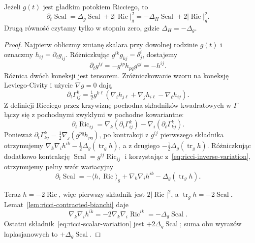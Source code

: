 \begin{twierdzenie}
\label{thm:ricci-scalar-evolution}
Jeżeli $g(t)$ jest gładkim potokiem Ricciego, to
\begin{equation}\label{eq:ricci-scalar-evolution}
 \partial_t\operatorname{Scal}
 =\Delta_g\operatorname{Scal}
  +2|\operatorname{Ric}|_g^2
 =-\Delta_H\operatorname{Scal}
  +2|\operatorname{Ric}|_g^2.
\end{equation}
Drugą równość czytamy tylko w stopniu zero, gdzie
$\Delta_H=-\Delta_g$.
\end{twierdzenie}
\begin{proof}
Najpierw obliczmy zmianę skalara przy dowolnej
rodzinie $g(t)$ i oznaczmy $h_{ij}=\partial_tg_{ij}$.
Różniczkując $g^{ik}g_{kj}=\delta^i_j$, dostajemy
\begin{equation}\label{eq:ricci-inverse-variation}
 \partial_tg^{ij}=-g^{ip}h_{pq}g^{qj}=-h^{ij}.
\end{equation}
Różnica dwóch koneksji jest tensorem. Zróżniczkowanie
wzoru na koneksję Leviego-Civity i użycie $\nabla g=0$
dają
\begin{equation}\label{eq:ricci-connection-variation}
 \partial_t\Gamma^k_{ij}
 =\tfrac12g^{k\ell}
   (\nabla_i h_{j\ell}+\nabla_j h_{i\ell}
                        -\nabla_\ell h_{ij}).
\end{equation}
Z definicji Ricciego przez krzywiznę pochodna
składników kwadratowych w $\Gamma$ łączy się
z pochodnymi zwykłymi w pochodne kowariantne:
\[
 \partial_t\operatorname{Ric}_{ij}
 =\nabla_k(\partial_t\Gamma^k_{ij})
   -\nabla_i(\partial_t\Gamma^k_{kj}).
\]
Ponieważ $\partial_t\Gamma^k_{kj}
=\tfrac12\nabla_j(g^{pq}h_{pq})$, po kontrakcji
z $g^{ij}$ pierwszego składnika otrzymujemy
$\nabla_k\nabla_i h^{ik}
-\tfrac12\Delta_g(\operatorname{tr}_gh)$,
a z drugiego
$-\tfrac12\Delta_g(\operatorname{tr}_gh)$.
Różniczkując dodatkowo kontrakcję
$\operatorname{Scal}=g^{ij}\operatorname{Ric}_{ij}$
i korzystając z~\eqref{eq:ricci-inverse-variation},
otrzymujemy pełny wzór wariacyjny
\begin{equation}\label{eq:ricci-scalar-variation}
 \partial_t\operatorname{Scal}
 =-\langle h,\operatorname{Ric}\rangle_g
   +\nabla_k\nabla_i h^{ik}
   -\Delta_g(\operatorname{tr}_g h).
\end{equation}

Teraz $h=-2\operatorname{Ric}$, więc pierwszy składnik
jest $2|\operatorname{Ric}|^2$, a
$\operatorname{tr}_gh=-2\operatorname{Scal}$.
Lemat~\ref{lem:ricci-contracted-bianchi} daje
\[
 \nabla_k\nabla_i h^{ik}
 =-2\nabla_k\nabla_i\operatorname{Ric}^{ik}
 =-\Delta_g\operatorname{Scal}.
\]
Ostatni składnik~\eqref{eq:ricci-scalar-variation}
jest $+2\Delta_g\operatorname{Scal}$; suma obu
wyrazów laplasjanowych to $+\Delta_g\operatorname{Scal}$.
\end{proof}

